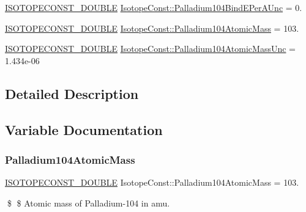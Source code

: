 \begin{DoxyCompactItemize}
\mbox{\hyperlink{group___isotope_const-_macros_ga8f45a7272ce02c0b4c65c44636ed719a}{I\+S\+O\+T\+O\+P\+E\+C\+O\+N\+S\+T\+\_\+\+D\+O\+U\+B\+LE}} \mbox{\hyperlink{group___isotope_const-_palladium-_pd104_gaedc6d826dd034c8abe9d4f9fe6909f16}{Isotope\+Const\+::\+Palladium104\+Bind\+E\+Per\+A\+Unc}} = 0.
\item 
\mbox{\hyperlink{group___isotope_const-_macros_ga8f45a7272ce02c0b4c65c44636ed719a}{I\+S\+O\+T\+O\+P\+E\+C\+O\+N\+S\+T\+\_\+\+D\+O\+U\+B\+LE}} \mbox{\hyperlink{group___isotope_const-_palladium-_pd104_gab7ffee62d8a11678bd73af67d511f970}{Isotope\+Const\+::\+Palladium104\+Atomic\+Mass}} = 103.
\item 
\mbox{\hyperlink{group___isotope_const-_macros_ga8f45a7272ce02c0b4c65c44636ed719a}{I\+S\+O\+T\+O\+P\+E\+C\+O\+N\+S\+T\+\_\+\+D\+O\+U\+B\+LE}} \mbox{\hyperlink{group___isotope_const-_palladium-_pd104_ga3ffa55ca085364dedced26478873f95c}{Isotope\+Const\+::\+Palladium104\+Atomic\+Mass\+Unc}} = 1.\+434e-\/06
\end{DoxyCompactItemize}


\subsection{Detailed Description}


\subsection{Variable Documentation}
\mbox{\label{group___isotope_const-_palladium-_pd104_gab7ffee62d8a11678bd73af67d511f970}} 
\subsubsection{\texorpdfstring{Palladium104\+Atomic\+Mass}{Palladium104AtomicMass}}
{\footnotesize\ttfamily \mbox{\hyperlink{group___isotope_const-_macros_ga8f45a7272ce02c0b4c65c44636ed719a}{I\+S\+O\+T\+O\+P\+E\+C\+O\+N\+S\+T\+\_\+\+D\+O\+U\+B\+LE}} Isotope\+Const\+::\+Palladium104\+Atomic\+Mass = 103.}

\$ \$ Atomic mass of Palladium-\/104 in amu. \mbox{\label{group___isotope_const-_palladium-_pd104_ga3ffa55ca085364dedced26478873f95c}} 
